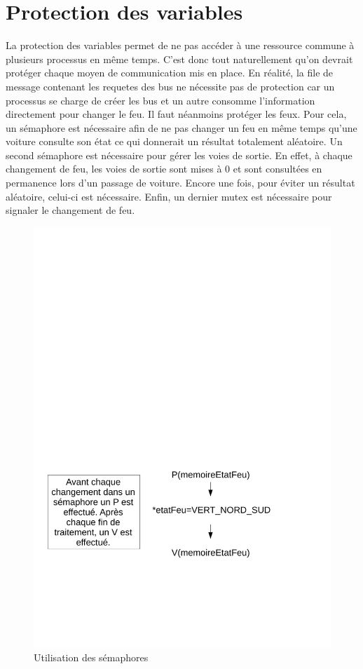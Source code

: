 \section{Protection des variables}
La protection des variables permet de ne pas accéder à une ressource commune à plusieurs processus en même temps. C'est donc tout naturellement qu'on devrait protéger chaque moyen de communication mis en place. En réalité, la file de message contenant les requetes des bus ne nécessite pas de protection car un processus se charge de créer les bus et un autre consomme l'information directement pour changer le feu. Il faut néanmoins protéger les feux. Pour cela, un sémaphore est nécessaire afin de ne pas changer un feu en même temps qu'une voiture consulte son état ce qui donnerait un résultat totalement aléatoire. Un second sémaphore est nécessaire pour gérer les voies de sortie. En effet, à chaque changement de feu, les voies de sortie sont mises à 0 et sont consultées en permanence lors d'un passage de voiture. Encore une fois, pour éviter un résultat aléatoire, celui-ci est nécessaire. Enfin, un dernier mutex est nécessaire pour signaler le changement de feu.

\begin{figure}[htb!]
\centering
\includegraphics[scale=0.5]{graphe2LO41.pdf}

\caption{Utilisation des sémaphores}
\end{figure}
